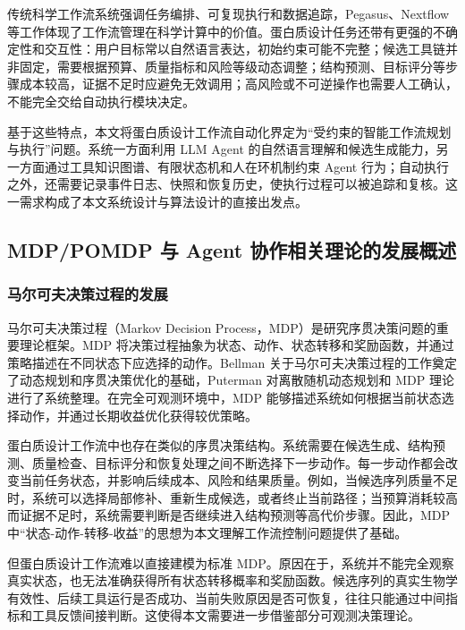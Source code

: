 传统科学工作流系统强调任务编排、可复现执行和数据追踪，Pegasus、Nextflow
等工作体现了工作流管理在科学计算中的价值\citep{deelman2005pegasus, ditommaso2017nextflow}。蛋白质设计任务还带有更强的不确定性和交互性：用户目标常以自然语言表达，初始约束可能不完整；候选工具链并非固定，需要根据预算、质量指标和风险等级动态调整；结构预测、目标评分等步骤成本较高，证据不足时应避免无效调用；高风险或不可逆操作也需要人工确认，不能完全交给自动执行模块决定。

基于这些特点，本文将蛋白质设计工作流自动化界定为``受约束的智能工作流规划与执行''问题。系统一方面利用
LLM Agent
的自然语言理解和候选生成能力，另一方面通过工具知识图谱、有限状态机和人在环机制约束
Agent
行为；自动执行之外，还需要记录事件日志、快照和恢复历史，使执行过程可以被追踪和复核。这一需求构成了本文系统设计与算法设计的直接出发点。

\subsection{MDP/POMDP 与 Agent
协作相关理论的发展概述}\label{mdppomdp-ux4e0e-agent-ux534fux4f5cux76f8ux5173ux7406ux8bbaux7684ux53d1ux5c55ux6982ux8ff0}

\subsubsection{马尔可夫决策过程的发展}\label{ux9a6cux5c14ux53efux592bux51b3ux7b56ux8fc7ux7a0bux7684ux53d1ux5c55}

马尔可夫决策过程（Markov Decision
Process，MDP）是研究序贯决策问题的重要理论框架。MDP
将决策过程抽象为状态、动作、状态转移和奖励函数，并通过策略描述在不同状态下应选择的动作。Bellman
关于马尔可夫决策过程的工作奠定了动态规划和序贯决策优化的基础\citep{bellman1957mdp}，Puterman
对离散随机动态规划和 MDP
理论进行了系统整理\citep{puterman1994mdp}。在完全可观测环境中，MDP
能够描述系统如何根据当前状态选择动作，并通过长期收益优化获得较优策略。

蛋白质设计工作流中也存在类似的序贯决策结构。系统需要在候选生成、结构预测、质量检查、目标评分和恢复处理之间不断选择下一步动作。每一步动作都会改变当前任务状态，并影响后续成本、风险和结果质量。例如，当候选序列质量不足时，系统可以选择局部修补、重新生成候选，或者终止当前路径；当预算消耗较高而证据不足时，系统需要判断是否继续进入结构预测等高代价步骤。因此，MDP
中``状态-动作-转移-收益''的思想为本文理解工作流控制问题提供了基础。

但蛋白质设计工作流难以直接建模为标准
MDP。原因在于，系统并不能完全观察真实状态，也无法准确获得所有状态转移概率和奖励函数。候选序列的真实生物学有效性、后续工具运行是否成功、当前失败原因是否可恢复，往往只能通过中间指标和工具反馈间接判断。这使得本文需要进一步借鉴部分可观测决策理论。

